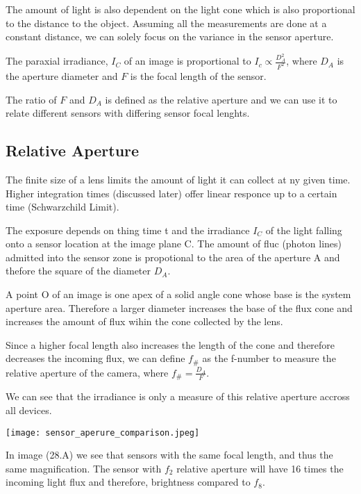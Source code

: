 \documentclass{article}
\begin{document}
The amount of light is also dependent on the light cone which is also
proportional to the distance to the object. Assuming all the measurements are
done at a constant distance, we can solely focus on the variance in the
sensor aperture.

The paraxial irradiance, $ I_C$ of an image is proportional to $I_c \propto \frac{D^2_A}{F^2} $,
where $ D_A$ is the aperture diameter and $ F$ is the focal length of the sensor.

The ratio of $ F$ and $ D_A$ is defined as the relative aperture and we can use it
to relate different sensors with differing sensor focal lenghts.

\subsection{Relative Aperture}

The finite size of a lens limits the amount of light it can collect at ny given time.
Higher integration times (discussed later) offer linear responce up to a certain
time (Schwarzchild Limit).

The exposure depends on thing time t and the irradiance $ I_C$
of the light falling onto a sensor location at the image plane C.
The amount of fluc (photon lines) admitted into the sensor zone is propotional
to the area of the aperture A and thefore the square of the diameter $ D_A$.

A point O of an image is one apex
of a solid angle cone whose base is the system aperture area. Therefore a larger
diameter increases the base of the flux cone and increases the amount of flux wihin the cone
collected by the lens.

Since a higher focal length also increases the length of
the cone and therefore decreases the incoming flux, we can define $ f_{\#}$ as the f-number
to measure the relative aperture of the camera, where $ f_{\#} = \frac{D_A}{F}$.

We can see that the irradiance is only a measure of this relative aperture accross all devices.

\begin{center}
  \texttt{[image: sensor\_aperure\_comparison.jpeg]}
\end{center}


In image (28.A) we see that sensors with the same focal length, and thus the same magnification.
The sensor with  $f_2$ relative aperture will have 16 times the incoming light flux and therefore,
brightness compared to $f_8$.
\end{document}
